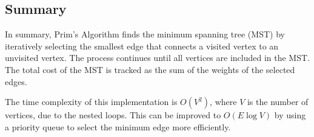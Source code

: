 \documentclass{book}
\begin{document}

\subsection{Summary}

In summary, Prim's Algorithm finds the minimum spanning tree (MST) by iteratively selecting the smallest edge that connects a visited vertex to an unvisited vertex. The process continues until all vertices are included in the MST. The total cost of the MST is tracked as the sum of the weights of the selected edges.

The time complexity of this implementation is \(O(V^2)\), where \(V\) is the number of vertices, due to the nested loops. This can be improved to \(O(E \log V)\) by using a priority queue to select the minimum edge more efficiently.
\end{document}

